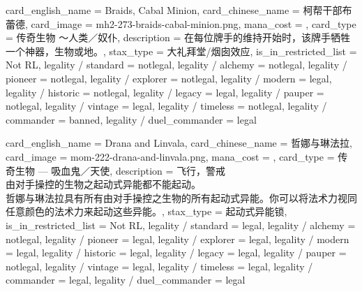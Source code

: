\documentclass[lang = cn, color = black, 10pt]{AllThatStax}
\begin{document}
\card
{
	card_english_name = {Braids, Cabal Minion},
	card_chinese_name = {柯帮干部布蕾德},
	card_image = mh2-273-braids-cabal-minion.png,
	mana_cost = ,
	card_type = 传奇生物 ～人类／奴仆,
	description = {在每位牌手的维持开始时，该牌手牺牲一个神器，生物或地。},
	stax_type = 大礼拜堂/烟囱效应,
	is_in_restricted_list = Not RL,
	legality / standard = notlegal,
	legality / alchemy = notlegal,
	legality / pioneer = notlegal,
	legality / explorer = notlegal,
	legality / modern = legal,
	legality / historic = notlegal,
	legality / legacy = legal,
	legality / pauper = notlegal,
	legality / vintage = legal,
	legality / timeless = notlegal,
	legality / commander = banned,
	legality / duel_commander = legal
}

\card
{
	card_english_name = {Drana and Linvala},
	card_chinese_name = {哲娜与琳法拉},
	card_image = mom-222-drana-and-linvala.png,
	mana_cost = ,
	card_type = 传奇生物 — 吸血鬼／天使,
	description = {飞行，警戒\\
		由对手操控的生物之起动式异能都不能起动。\\
		哲娜与琳法拉具有所有由对手操控之生物的所有起动式异能。你可以将法术力视同任意颜色的法术力来起动这些异能。},
	stax_type = 起动式异能锁,
	is_in_restricted_list = Not RL,
	legality / standard = legal,
	legality / alchemy = notlegal,
	legality / pioneer = legal,
	legality / explorer = legal,
	legality / modern = legal,
	legality / historic = legal,
	legality / legacy = legal,
	legality / pauper = notlegal,
	legality / vintage = legal,
	legality / timeless = legal,
	legality / commander = legal,
	legality / duel_commander = legal
}
\end{document}

